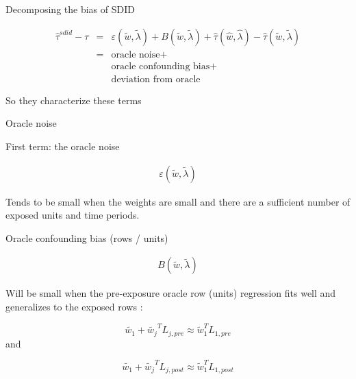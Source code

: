 \documentclass{beamer}
\begin{document}
\begin{frame}{Decomposing the bias of SDID}

\begin{eqnarray*}
\widehat{\tau}^{sdid} - \tau  &=& \varepsilon(\widetilde{w}, \widetilde{\lambda}) + B(\widetilde{w}, \widetilde{\lambda}) + \widehat{\tau}(\widehat{w},\widehat{\lambda}) - \widehat{\tau}(\widetilde{w},\widetilde{\lambda}) \\
&=& \textrm{oracle noise} +  \\
&& \textrm{oracle confounding bias} + \\
&&\textrm{deviation from oracle}
\end{eqnarray*}

\bigskip

So they characterize these terms

\end{frame}


\begin{frame}{Oracle noise}

First term: the oracle noise

\bigskip

\begin{eqnarray*}
\varepsilon(\widetilde{w}, \widetilde{\lambda})
\end{eqnarray*}

\bigskip

Tends to be small when the weights are small and there are a sufficient number of exposed units and time periods. 

\end{frame}

\begin{frame}{Oracle confounding bias (rows / units)}

\begin{eqnarray*}
B(\widetilde{w}, \widetilde{\lambda}) 
\end{eqnarray*}

\bigskip

Will be small when the pre-exposure oracle row (units) regression fits well and generalizes to the exposed rows :
 
 $$\widetilde{w_1} + \widetilde{w_{j}}^TL_{j,pre} \approx \widetilde{w}_1^TL_{1,pre}$$and
 
 $$\widetilde{w_1} + \widetilde{w_{j}}^TL_{j,post} \approx \widetilde{w}_1^TL_{1,post}$$
 
 \end{frame}
 
\end{document}
